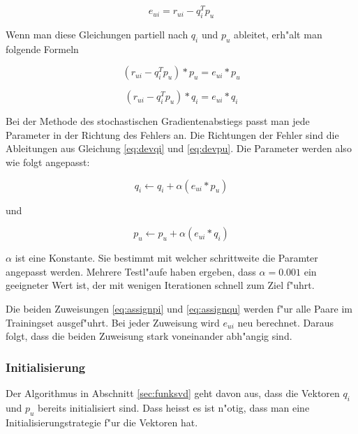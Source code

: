 \documentclass[a4paper, 12pt]{article}
\begin{document}
\begin{equation}
  \label{eq:error1}
  e_{ui} = r_{ui} - q_i^T p_u
\end{equation}

Wenn man diese Gleichungen partiell nach $q_i$ und $p_u$ ableitet, erh"alt man folgende Formeln

\begin{equation}
  \label{eq:devqi}
  (r_{ui} - q_i^T p_u) * p_u =  e_{ui} * p_u
\end{equation}

\begin{equation}
  \label{eq:devpu}
    (r_{ui} - q_i^T p_u) * q_i =  e_{ui} * q_i
\end{equation}

Bei der Methode des stochastischen Gradientenabstiegs passt man jede Parameter in der Richtung des Fehlers an. Die Richtungen der Fehler sind die Ableitungen aus Gleichung \ref{eq:devqi} und \ref{eq:devpu}. Die Parameter werden also wie folgt angepasst:

\begin{equation}
  \label{eq:assignpi}
 q_i \leftarrow q_i + \alpha (e_{ui} * p_u)
\end{equation}

und

\begin{equation}
  \label{eq:assignqu}
 p_u \leftarrow p_u + \alpha (e_{ui} * q_i)
\end{equation}

$\alpha$ ist eine Konstante. Sie bestimmt mit welcher schrittweite die Paramter angepasst werden. Mehrere Testl"aufe haben ergeben, dass $\alpha = 0.001$ ein geeigneter Wert ist, der mit wenigen Iterationen schnell zum Ziel f"uhrt.

Die beiden Zuweisungen \ref{eq:assignpi} und \ref{eq:assignqu} werden f"ur alle Paare im Trainingset ausgef"uhrt. Bei jeder Zuweisung wird $e_{ui}$ neu berechnet. Daraus folgt, dass die beiden Zuweisung stark voneinander abh"angig sind.

\subsubsection{Initialisierung}
\label{sec:init}

Der Algorithmus in Abschnitt \ref{sec:funksvd} geht davon aus, dass die Vektoren $q_i$ und $p_u$ bereits initialisiert sind. Dass heisst es ist n"otig, dass man eine Initialisierungstrategie f"ur die Vektoren hat. 
\end{document}

